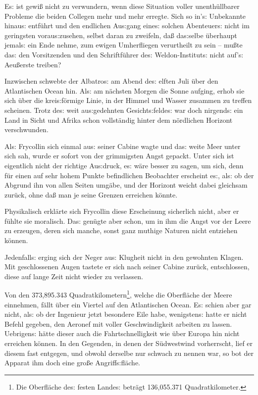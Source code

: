 \documentclass[oneside,12pt]{book}
\newcommand{\s}{s:}
\begin{document}
E{\s} ist gewi{\ss} nicht zu verwundern, wenn diese Situation voller
unenth\"ullbarer Probleme die beiden Collegen mehr und mehr erregte.
Sich so in'{\s} Unbekannte hinau{\s} entf\"uhrt und den endlichen
Au{\s}gang eine{\s} solchen Abenteuer{\s} nicht im geringsten
vorau{\s}zusehen, selbst daran zu zweifeln, da{\ss} da{\s}selbe
\"uberhaupt jemal{\s} ein Ende nehme, zum ewigen Umherfliegen
verurtheilt zu sein -- mu{\ss}te da{\s} den Vorsitzenden und den
Schriftf\"uhrer de{\s} Weldon-Institut{\s} nicht auf'{\s}
Aeu{\ss}erste treiben?

Inzwischen schwebte der {\glqq}Albatro{\s}{\grqq} am Abend de{\s}
elften Juli \"uber den Atlantischen Ocean hin. Al{\s} am n\"achsten
Morgen die Sonne aufging, erhob sie sich \"uber die krei{\s}f\"ormige
Linie, in der Himmel und Wasser zusammen zu treffen scheinen. Trotz
de{\s} weit au{\s}gedehnten Gesicht{\s}felde{\s} war doch nirgend{\s}
ein Land in Sicht und Afrika schon vollst\"andig hinter dem
n\"ordlichen Horizont verschwunden.

Al{\s} Frycollin sich einmal au{\s} seiner Cabine wagte und da{\s}
weite Meer unter sich sah, wurde er sofort von der grimmigsten Angst
gepackt. Unter sich ist eigentlich nicht der richtige Au{\s}druck,
e{\s} w\"are besser zu sagen, {\glqq}um sich{\grqq}, denn f\"ur einen
auf sehr hohem Punkte befindlichen Beobachter erscheint e{\s}, al{\s}
ob der Abgrund ihn von allen Seiten umg\"abe, und der Horizont weicht
dabei gleichsam zur\"uck, ohne da{\ss} man je seine Grenzen erreichen
k\"onnte.

Physikalisch erkl\"arte sich Frycollin diese Erscheinung sicherlich
nicht, aber er f\"uhlte sie moralisch. Da{\s} gen\"ugte aber schon,
um in ihm die {\glqq}Angst vor der Leere{\grqq} zu erzeugen, deren
sich manche, sonst ganz muthige Naturen nicht ent\/ziehen k\"onnen.

Jedenfall{\s} erging sich der Neger au{\s} Klugheit nicht in den
gewohnten Klagen. Mit geschlossenen Augen tastete er sich nach seiner
Cabine zur\"uck, entschlossen, diese auf lange Zeit nicht wieder zu
verlassen.

Von den 373,895.343 Quadratkilometern\footnote[1]{\frakfamily Die
Oberfl\"ache de{\s} festen Lande{\s} betr\"agt 136,055.371
Quadratkilometer.}, welche die Oberfl\"ache der Meere einnehmen,
f\"allt \"uber ein Viertel auf den Atlantischen Ocean. E{\s} schien
aber gar nicht, al{\s} ob der Ingenieur jetzt besondere Eile habe,
wenigsten{\s} hatte er nicht Befehl gegeben, den Aeronef mit voller
Geschwindigkeit arbeiten zu lassen. Uebrigen{\s} h\"atte dieser auch
die Fahrtschnelligkeit wie \"uber Europa hin nicht erreichen
k\"onnen. In den Gegenden, in denen der S\"udwestwind vorherrscht,
lief er diesem fast entgegen, und obwohl derselbe nur schwach zu
nennen war, so bot der Apparat ihm doch eine gro{\ss}e
Angriff{\s}fl\"ache.
\end{document}

